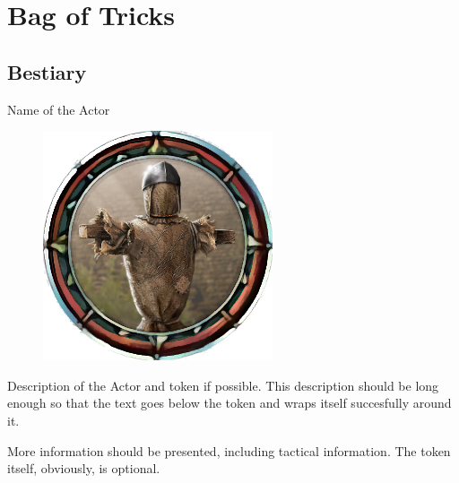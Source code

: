 \chapter{Bag of Tricks}

\label{annex_samples_bestiary}

\section{Bestiary}



\begin{monsterboxbg}{Name of the Actor}

    \begin{figure}
        \includegraphics[width=70bp,height=70bp]{img/boss_token_example.png}
    \end{figure}

    Description of the Actor and token if possible. This description should be long enough so that the text goes below the token and wraps itself succesfully around it.

    More information should be presented, including tactical information. The token itself, obviously, is optional.
    
    \rpghline
    \stats[ %
        STR = \stat{12}, 
        DEX = \stat{7},
        CON = \stat{10},
        INT = \stat{10},
        WIS = \stat{10},
        CHA = \stat{10},
    ]
    \rpghline


\end{monsterboxbg}
